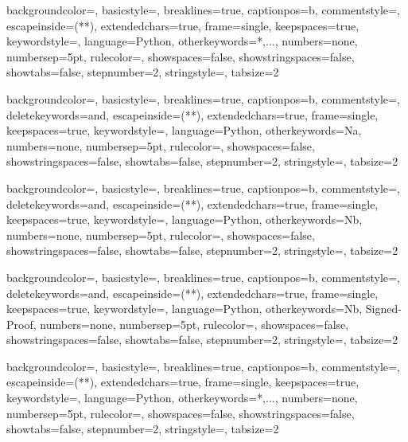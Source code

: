 \documentclass{MScthesisITEM}
\begin{document}
 {backgroundcolor=\color{myback}, basicstyle=\normalsize, breaklines=true, captionpos=b,                commentstyle=\color{mygreen}, escapeinside={(*}{*)}, extendedchars=true, frame=single, keepspaces=true, keywordstyle=\color{black}, language=Python, otherkeywords={*,...}, numbers=none, numbersep=5pt, rulecolor=\color{mygray}, showspaces=false, showstringspaces=false, showtabs=false, stepnumber=2, stringstyle=\color{mymauve}, tabsize=2}   

 {backgroundcolor=\color{myback}, basicstyle=\normalsize, breaklines=true, captionpos=b, commentstyle=\color{mygreen}, deletekeywords={and}, escapeinside={(*}{*)}, extendedchars=true, frame=single, keepspaces=true, keywordstyle=\color{blue}, language=Python, otherkeywords={Na}, numbers=none, numbersep=5pt, rulecolor=\color{mygray}, showspaces=false, showstringspaces=false, showtabs=false, stepnumber=2, stringstyle=\color{mymauve}, tabsize=2}

 {backgroundcolor=\color{myback}, basicstyle=\normalsize, breaklines=true, captionpos=b, commentstyle=\color{mygreen}, deletekeywords={and}, escapeinside={(*}{*)}, extendedchars=true, frame=single, keepspaces=true, keywordstyle=\color{blue}, language=Python, otherkeywords={Nb}, numbers=none, numbersep=5pt, rulecolor=\color{mygray}, showspaces=false, showstringspaces=false, showtabs=false, stepnumber=2, stringstyle=\color{mymauve}, tabsize=2}

 {backgroundcolor=\color{myback}, basicstyle=\normalsize, breaklines=true, captionpos=b, commentstyle=\color{mygreen}, deletekeywords={and}, escapeinside={(*}{*)}, extendedchars=true, frame=single, keepspaces=true, keywordstyle=\color{blue}, language=Python, otherkeywords={Nb, Signed-Proof}, numbers=none, numbersep=5pt, rulecolor=\color{mygray}, showspaces=false, showstringspaces=false, showtabs=false, stepnumber=2, stringstyle=\color{mymauve}, tabsize=2} 

 {backgroundcolor=\color{myback}, basicstyle=\normalsize, breaklines=true, captionpos=b,                commentstyle=\color{mygreen}, escapeinside={(*}{*)}, extendedchars=true, frame=single, keepspaces=true, keywordstyle=\color{blue}, language=Python, otherkeywords={*,...}, numbers=none, numbersep=5pt, rulecolor=\color{mygray}, showspaces=false, showstringspaces=false, showtabs=false, stepnumber=2, stringstyle=\color{mymauve}, tabsize=2}
\end{document}
